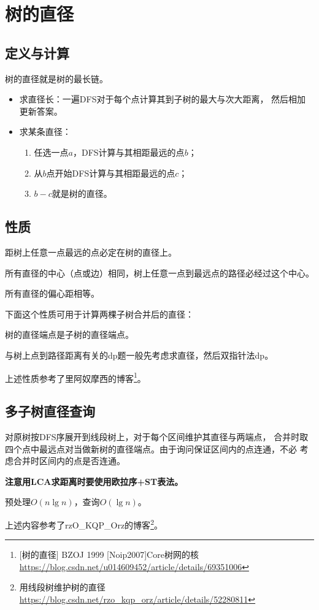 \section{树的直径}
\subsection{定义与计算}
树的直径就是树的最长链。

\begin{itemize}
    \item 求直径长：一遍DFS对于每个点计算其到子树的最大与次大距离，
    然后相加更新答案。
    \item
    求某条直径：
    \begin{enumerate}
        \item 任选一点$a$，DFS计算与其相距最远的点$b$；
        \item 从$b$点开始DFS计算与其相距最远的点$c$；
        \item $b-c$就是树的直径。
    \end{enumerate}
\end{itemize}

\subsection{性质}

\begin{property}
    距树上任意一点最远的点必定在树的直径上。
\end{property}

\begin{property}
    所有直径的中心（点或边）相同，树上任意一点到最远点的路径必经过这个中心。
\end{property}

\begin{property}
    所有直径的偏心距相等。
\end{property}

下面这个性质可用于计算两棵子树合并后的直径：
\begin{property}
    树的直径端点是子树的直径端点。
\end{property}

与树上点到路径距离有关的dp题一般先考虑求直径，然后双指针法dp。

上述性质参考了里阿奴摩西的博客\footnote{[树的直径] BZOJ 1999 [Noip2007]Core树网的核
\url{https://blog.csdn.net/u014609452/article/details/69351006}}。

\subsection{多子树直径查询}
对原树按DFS序展开到线段树上，对于每个区间维护其直径与两端点，
合并时取四个点中最远点对当做新树的直径端点。由于询问保证区间内的点连通，不必
考虑合并时区间内的点是否连通。

{\bfseries 注意用LCA求距离时要使用欧拉序+ST表法。}

预处理$O(n\lg n)$，查询$O(\lg n)$。

上述内容参考了rzO\_KQP\_Orz的博客\footnote{用线段树维护树的直径
\url{https://blog.csdn.net/rzo\_kqp\_orz/article/details/52280811}
}。
